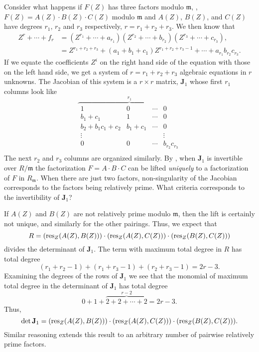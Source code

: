 {Consider what happens if $F(Z)$ has three factors modulo
$\mathfrak{m}$, \ie, $F(Z) = A(Z) \cdot B(Z) \cdot C(Z)$ modulo
$\mathfrak{m}$ and $A(Z)$, $B(Z)$, and $C(Z)$ have degrees $r_1$,
$r_2$ and $r_3$ respectively, $r = r_1 + r_2 + r_3$.  We then know
that
\[
\begin{aligned}
  Z^r + \cdots + f_r&=
    (Z^{r_1} + \cdots + a_{r_{1}}) (Z^{r_2} + \cdots + b_{r_{2}})
    (Z^{r_3} + \cdots + c_{r_{3}}),\\
   &= Z^{r_1 + r_2 + r_3} + (a_{1} + b_{1} + c_{1}) Z^{r_1 + r_2 + r_3 -1} 
    + \cdots + a_{r_{1}} b_{r_{2}} c_{r_{3}}.
\end{aligned}
\]
If we equate the coefficients $Z^i$ on the right hand side of the
equation with those on the left hand side, we get a system of $r = r_1 + 
r_2 + r_3$ algebraic equations in $r$ unknowns.  The Jacobian of this 
system is a $r\times r$ matrix, $\mathbf{J}_1$ whose first $r_1$ columns 
look like 
\[
\overbrace{
\begin{array}{cccc}
1 & 0 & \cdots  & 0 \\
b_1 + c_1 & 1 & \cdots & 0\\
b_2 + b_1 c_1 + c_2 & b_1 + c_1 &  \cdots & 0 \\
\vdots & & & \vdots \\
0 & 0 & \cdots & b_{r_2} c_{r_3} \\
\end{array}}^{r_1}
\]
The next $r_2$ and $r_3$ columns are organized similarly.  By
, when $\mathbf{J}_1$ is invertible over
$R/\mathfrak{m}$ the factorization $F = A \cdot B \cdot C$ can be lifted
{\em uniquely} to a factorization of $F$ in $R_\mathfrak{m}$.  When there
are just two factors, non-singularity of the Jacobian corresponds to
the factors being relatively prime.  What criteria corresponds to the
invertibility of $\mathbf{J}_1$?

If $A(Z)$ and $B(Z)$ are not relatively prime modulo $\mathfrak{m}$, then
the lift is certainly not unique, and similarly for the other pairings.
Thus, we expect that
\[
R = (\mathop{\rm res}\nolimits_Z (A(Z), B(Z))) \cdot (\mathop{\rm res}\nolimits_Z (A(Z), C(Z))) 
  \cdot (\mathop{\rm res}\nolimits_Z (B(Z), C(Z)))
\]
divides the determinant of $\mathbf{J}_1$.  The term with maximum total 
degree in $R$ has total degree 
\[
(r_1 + r_2 - 1) + (r_1 + r_3 - 1) + (r_2 + r_3 - 1) = 2r -3.
\]
Examining the degrees of the rows of $\mathbf{J}_1$ we see that the monomial
of maximum total degree in 
the determinant of $\mathbf{J}_1$ has total degree
\[
0 + 1 + \overbrace{2 + 2 + \cdots + 2}^{r-2} = 2r -3.
\]
Thus,
\[
\det \mathbf{J}_1 = (\mathop{\rm res}\nolimits_Z (A(Z), B(Z))) \cdot (\mathop{\rm res}\nolimits_Z (A(Z), C(Z))) 
  \cdot (\mathop{\rm res}\nolimits_Z (B(Z), C(Z))).
\]
Similar reasoning extends this result to an arbitrary number of
pairwise relatively prime factors.  

}
